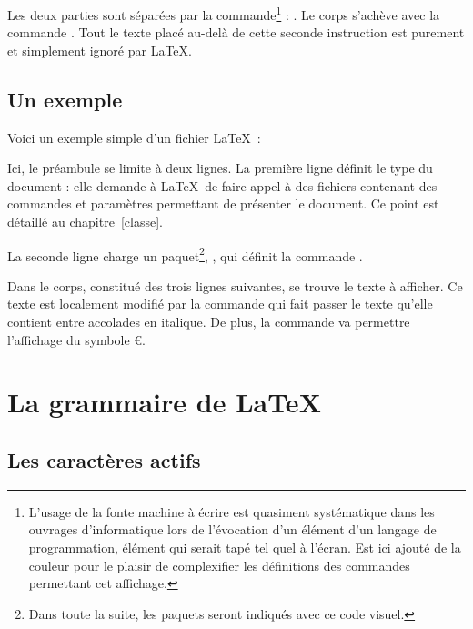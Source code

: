 Les deux parties sont séparées par la commande\footnote{L'usage de la fonte \og machine à écrire \fg{} est quasiment systématique dans les ouvrages d'informatique lors de l'évocation d'un élément d'un langage de programmation, élément qui serait tapé tel quel à l'écran. Est ici ajouté de la couleur pour le plaisir de complexifier les définitions des commandes permettant cet affichage.} : . Le corps s'achève avec la commande . Tout le texte placé au-delà de cette seconde instruction est purement et simplement ignoré par \LaTeX.


\subsection{Un exemple}

Voici un exemple simple d'un fichier \LaTeX\ : 


Ici, le préambule se limite à deux lignes. La première ligne définit le type du document : elle demande à \LaTeX\ de faire appel à des fichiers contenant des commandes et paramètres permettant de présenter le document. Ce point est détaillé au chapitre~\ref{classe}.

La seconde ligne charge un paquet\footnote{Dans toute la suite, les paquets seront indiqués avec ce code visuel.}, , qui définit la commande .

Dans le corps, constitué des trois lignes suivantes, se trouve le texte à afficher. Ce texte est localement modifié par la commande  qui fait passer le texte qu'elle contient entre accolades en italique. De plus, la commande  va permettre l'affichage du symbole \euro.


\section{La \og grammaire \fg{} de \LaTeX}
\subsection{Les caractères actifs} 

